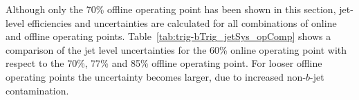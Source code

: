 
Although only the 70\% offline operating point has been shown in this section,
jet-level efficiencies and uncertainties are calculated for all combinations of online and offline operating points.
Table~\ref{tab:trig-bTrig_jetSys_opComp} shows a comparison of the jet level uncertainties for the 60\% online operating point with respect to the 70\%, 77\% and 85\% offline operating point.
For looser offline operating points the uncertainty becomes larger, due to increased non-$b$-jet contamination.


